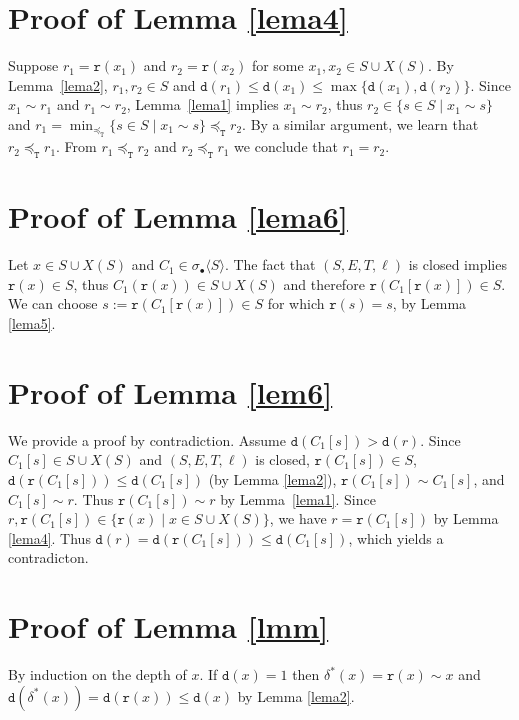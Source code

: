 \documentclass[preprint,12pt,english]{article}
\def\hole{\bullet}
\def\tr{\mathtt{r}}
\def\depth{\mathtt{d}}
\newcommand\pair[1]{\langle{#1}\rangle}
\begin{document}
\section{Proof of Lemma \ref{lema4}}
Suppose $r_1=\tr(x_1)$ and $r_2=\tr(x_2)$ for some $x_1,x_2\in S\cup X(S)$. By Lemma~\ref{lema2}, $r_1,r_2\in S$ and $\depth(r_1)\leq \depth(x_1)\leq\max\{\depth(x_1),\depth(r_2)\}.$ 
Since $x_1\sim r_1$ and $r_1\sim r_2$, Lemma~\ref{lema1} implies $x_1\sim r_2$, thus $r_2\in \{s\in S\mid x_1\sim s\}$ and $r_1=\min_{\preceq_{\mathtt{T}}}\{s\in S\mid x_1\sim s\}\preceq_{\mathtt{T}} r_2$. By a similar argument, we learn that $r_2\preceq_{\mathtt{T}} r_1$. From $r_1\preceq_{\mathtt{T}} r_2$ and $r_2\preceq_{\mathtt{T}} r_1$ we conclude that $r_1=r_2.$ 
\section{Proof of Lemma \ref{lema6}}
Let $x\in S\cup X(S)$ and $C_1\in\sigma_\hole\pair{S}$. The fact that $(S,E,T,\ell)$ is closed implies $\tr(x)\in S$, thus $C_1(\tr(x))\in S\cup X(S)$ and therefore $\tr(C_1[\tr(x)])\in S.$ We can choose $s:=\tr(C_1[\tr(x)])\in S$ for which $\tr(s)=s$, by Lemma \ref{lema5}. 
\section{Proof of Lemma \ref{lem6}}
We provide a proof by contradiction. Assume $\depth(C_1[s])>\depth(r).$
Since $C_1[s]\in S\cup X(S)$ and $(S,E,T,\ell)$ is closed, $\tr(C_1[s])\in S$, $\depth(\tr(C_1[s]))\leq \depth(C_1[s])$  (by Lemma \ref{lema2}),  $\tr(C_1[s])\sim C_1[s]$, and $C_1[s]\sim r$. Thus $\tr(C_1[s])\sim r$ by Lemma~\ref{lema1}.
Since $r,\tr(C_1[s])\in\{\tr(x)\mid x\in S\cup X(S)\}$, we have $r=\tr(C_1[s])$ by Lemma \ref{lema4}. Thus $\depth(r)=\depth(\tr(C_1[s]))\leq\depth(C_1[s])$, which yields a contradicton. 

\section{Proof of Lemma \ref{lmm}}
By induction on the depth of $x$. If $\depth(x)=1$ then $\delta^*(x)=\tr(x)\sim x$ and $\depth(\delta^*(x))=\depth(\tr(x)) \leq \depth(x)$ by Lemma \ref{lema2}. 
\end{document}
